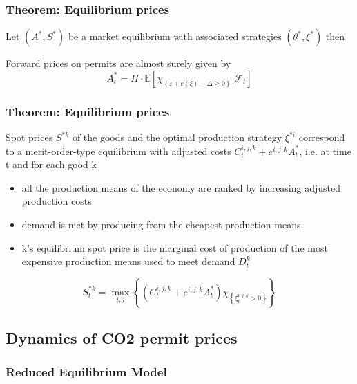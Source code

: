 \begin{frame}\frametitle{Theorem: Equilibrium prices}
Let $(A^*,S^*)$ be a market equilibrium with associated strategies $(\theta^*,\xi^*)$ then

Forward prices on permits are almost surely given by \[
A^*_t = \Pi \cdot \mathbb{E} \left[ \chi_{\left\{ \varepsilon + e(\xi) - \Delta \ge 0 \right\}} | \mathcal{F}_t \right]
\]

\end{frame}


\begin{frame}\frametitle{Theorem: Equilibrium prices}
 Spot prices $S^{*k}$ of the goods and the optimal production strategy $\xi^{*i}$ correspond to a merit-order-type equilibrium with adjusted costs $C_t^{i,j,k} + e^{i,j,k} A_t^*$, i.e. at time t and for each good k
\begin{itemize}
\item all the production means of the economy are ranked by increasing adjusted production costs
\item demand is met by producing from the cheapest production means
\item k's equilibrium spot price is the marginal cost of production of the most expensive production means used to meet demand $D_t^k$
\end{itemize}
\[
S_t^{*k} = \max_{i,j} \left\{ \left(C_t^{i,j,k} + e^{i,j,k} A_t^* \right) \chi_{\left\{\xi_t^{i,j,k}>0\right\}}\right\}
\]
\end{frame}

\subsection{Dynamics of CO2 permit prices}
\subsubsection{Reduced Equilibrium Model}

